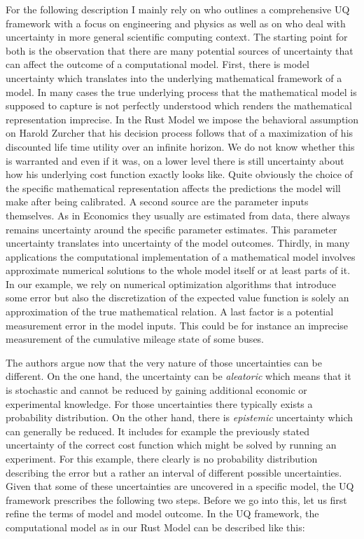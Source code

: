 For the following description I mainly rely on \cite{Smith.2013} who outlines a comprehensive UQ framework with a focus on engineering and physics as well as on \cite{Oberkampf.2010} who deal with uncertainty in more general scientific computing context.  The starting point for both is the observation that there are many potential sources of uncertainty that can affect the outcome of a computational model. First, there is model uncertainty which translates into the underlying mathematical framework of a model. In many cases the true underlying process that the mathematical model is supposed to capture is not perfectly understood which renders the mathematical representation imprecise. In the Rust Model we impose the behavioral assumption on Harold Zurcher that his decision process follows that of a maximization of his discounted life time utility over an infinite horizon. We do not know whether this is warranted and even if it was, on a lower level there is still uncertainty about how his underlying cost function exactly looks like. Quite obviously the choice of the specific mathematical representation affects the predictions the model will make after being calibrated. A second source are the parameter inputs themselves. As in Economics they usually are estimated from data, there always remains uncertainty around the specific parameter estimates. This parameter uncertainty translates into uncertainty of the model outcomes. Thirdly, in many applications the computational implementation of a mathematical model involves approximate numerical solutions to the whole model itself or at least parts of it. In our example, we rely on numerical optimization algorithms that introduce some error but also the discretization of the expected value function is solely an approximation of the true mathematical relation. A last factor is a potential measurement error in the model inputs. This could be for instance an imprecise measurement of the cumulative mileage state of some buses.

The authors argue now that the very nature of those uncertainties can be different. On the one hand, the uncertainty can be \textit{aleatoric} which means that it is stochastic and cannot be reduced by gaining additional economic or experimental knowledge. For those uncertainties there typically exists a probability distribution. On the other hand, there is \textit{epistemic} uncertainty which can generally be reduced. It includes for example the previously stated uncertainty of the correct cost function which might be solved by running an experiment. For this example, there clearly is no probability distribution describing the error but a rather an interval of different possible uncertainties. Given that some of these uncertainties are uncovered in a specific model, the UQ framework prescribes the following two steps. Before we go into this, let us first refine the terms of model and model outcome. In the UQ framework, the computational model as in our Rust Model can be described like this:

